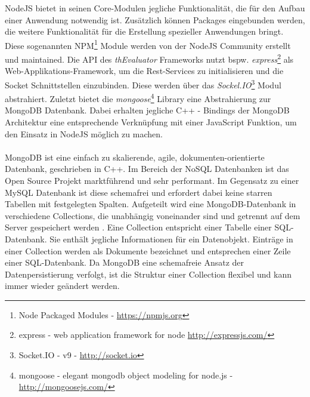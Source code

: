 NodeJS bietet in seinen Core-Modulen jegliche Funktionalität, die für den Aufbau einer Anwendung notwendig ist. Zusätzlich können Packages eingebunden werden, die weitere Funktionalität für die Erstellung spezieller Anwendungen bringt. Diese sogenannten NPM\footnote{Node Packaged Modules - \url{https://npmjs.org}} Module werden von der NodeJS Community erstellt und maintained. Die API des \textit{thEvaluator} Frameworks nutzt bspw. \textit{express}\footnote{express - web application framework for node \url{http://expressjs.com/}} als Web-Applikations-Framework, um die Rest-Services zu initialisieren und die Socket Schnittstellen einzubinden. Diese werden über das \textit{Sockel.IO}\footnote{Socket.IO - v9 - \url{http://socket.io}} Modul abstrahiert. Zuletzt bietet die \textit{mongoose}\footnote{mongoose - elegant mongodb object modeling for node.js - \url{http://mongoosejs.com/}} Library eine Abstrahierung zur MongoDB Datenbank. Dabei erhalten jegliche C++ - Bindings der MongoDB Architektur eine entsprechende Verknüpfung mit einer JavaScript Funktion, um den Einsatz in NodeJS möglich zu machen.\\
\\
MongoDB ist eine einfach zu skalierende, agile, dokumenten-orientierte Datenbank, geschrieben in C++. Im Bereich der NoSQL Datenbanken ist das Open Source Projekt marktführend und sehr performant. Im Gegensatz zu einer MySQL Datenbank ist diese schemafrei und erfordert dabei keine starren Tabellen mit festgelegten Spalten. Aufgeteilt wird eine MongoDB-Datenbank in verschiedene Collections, die unabhängig voneinander sind und getrennt auf dem Server gespeichert werden \cite{nosql}. Eine Collection entspricht einer Tabelle einer SQL-Datenbank. Sie enthält jegliche Informationen für ein Datenobjekt. Einträge in einer Collection werden als Dokumente bezeichnet und entsprechen einer Zeile einer SQL-Datenbank. Da MongoDB eine schemafreie Ansatz der Datenpersistierung verfolgt, ist die Struktur einer Collection flexibel und kann immer wieder geändert werden.

